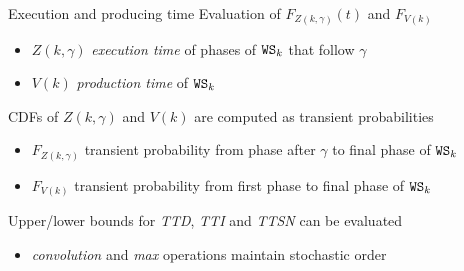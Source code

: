     \begin{frame}{Execution and producing time}
      Evaluation of $F_{Z(k,\gamma)}(t)$ and $F_{V(k)}$
      \begin{itemize}
        \item $Z(k,\gamma)$ \textit{execution time} of phases of $\mathtt{WS}_k$ that follow $\gamma$
        \item $V(k)$ \textit{production time} of $\mathtt{WS}_k$
      \end{itemize}
    
      \vspace{1em}
      CDFs of $Z(k,\gamma)$ and $V(k)$ are computed as transient probabilities
      
      \begin{itemize}
        \item $F_{Z(k,\gamma)}$ transient probability from phase after $\gamma$ to final phase of $\mathtt{WS}_k$
        \item $F_{V(k)}$ transient probability from first phase to final phase of $\mathtt{WS}_k$
      \end{itemize}
      
      \vspace{2em}
      Upper/lower bounds for \textit{TTD}, \textit{TTI} and \textit{TTSN} can be evaluated
      \begin{itemize}
        \item \textit{convolution} and \textit{max} operations maintain stochastic order
      \end{itemize}
    \end{frame}
    
